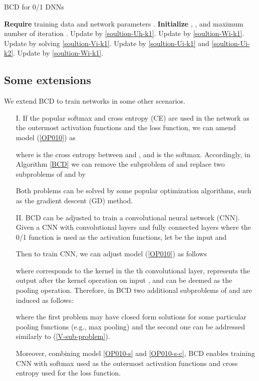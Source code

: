 \documentclass[journal]{IEEEtran}
\begin{document}
 \begin{algorithm}[!th] \caption{BCD for 0/1 DNNs\label{BCD}}
	\begin{algorithmic}[1]
	\STATE \textbf{Require} training data  and network parameters .
	\STATE \textbf{Initialize} , , and maximum number of iteration .
	\FOR{}
	\STATE Update  by \eqref{soultion-Uh-k1}.
	\STATE Update  by \eqref{soultion-Wi-k1}.
	 \FOR{ }
		\STATE Update  by solving \eqref{soultion-Vi-k1}.
		\STATE Update  by \eqref{soultion-Ui-k1} and \eqref{soultion-Ui-k2}.
		\STATE Update  by \eqref{soultion-Wi-k1}.
		\ENDFOR
\ENDFOR
\RETURN 
	\end{algorithmic}
\end{algorithm}
 
\subsection{Some extensions}\label{extension-BCD}
We extend BCD to train networks in some other scenarios. 
\begin{itemize}[leftmargin=12pt]
\item[I.] If the popular softmax and cross entropy (CE) are used in the network as the outermost activation functions and the  loss function, we can amend model (\ref{OP010}) as 

where  is the cross entropy between  and , and   is the softmax. Accordingly,  in Algorithm \ref{BCD} we can remove the subproblem of  and replace two subproblems  of  and  by

Both problems can be solved by some popular optimization algorithms, such as the gradient descent (GD) method.
\item[II.]  BCD can be adjusted to train a  convolutional neural network (CNN). Given a CNN with  convolutional layers and  fully connected layers where the 0/1 function is used as the activation functions, let  be the input and 

Then to train CNN, we can adjust model (\ref{OP010}) as follows

where  corresponds to the kernel in the th convolutional layer,  represents the output after the kernel operation on input ,   and  can be deemed as the pooling operation. Therefore, in BCD two additional subproblems of  and  are induced as follows:

where the first problem may have closed form solutions for some particular pooling functions   (e.g., max pooling) and the second one can be addressed similarly to  (\ref{V-sub-problem}).  

Moreover, combining model \eqref{OP010-s} and \eqref{OP010-s-c}, BCD enables training CNN with softmax used as the outermost activation functions   and cross entropy used for the loss function.
\end{itemize}
 
\end{document}
